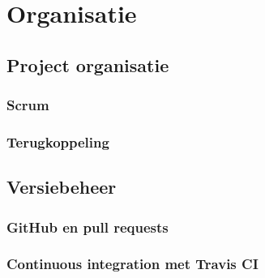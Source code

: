 \chapter{Organisatie}

\section{Project organisatie}

\subsection{Scrum}

\subsection{Terugkoppeling}

\section{Versiebeheer}

\subsection{GitHub en pull requests}

\subsection{Continuous integration met Travis CI}





